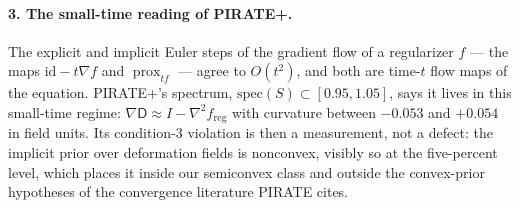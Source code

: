 \documentclass[11pt]{article}
\newcommand{\D}{\mathsf{D}}
\newcommand{\prox}{\operatorname{prox}}
\newcommand{\freg}{f_{\mathrm{reg}}}
\begin{document}
\paragraph{3. The small-time reading of PIRATE+.} The explicit and implicit Euler steps of the gradient flow of a regularizer $f$ --- the maps $\mathrm{id} - t\nabla f$ and $\prox_{tf}$ --- agree to $O(t^2)$, and both are time-$t$ flow maps of the equation. PIRATE+'s spectrum, $\mathrm{spec}(S) \subset [0.95, 1.05]$, says it lives in this small-time regime: $\nabla\D \approx I - \nabla^2 \freg$ with curvature between $-0.053$ and $+0.054$ in field units. Its condition-3 violation is then a measurement, not a defect: the implicit prior over deformation fields is nonconvex, visibly so at the five-percent level, which places it inside our semiconvex class and outside the convex-prior hypotheses of the convergence literature PIRATE cites.
\end{document}

